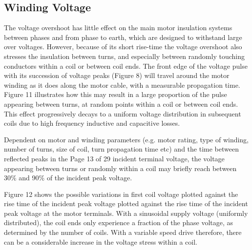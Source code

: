 \subsection{Winding Voltage}
The voltage overshoot has little effect on the main motor insulation systems between phases and from phase to earth, which are designed to withstand large over voltages. However,
because of its short rise-time the voltage overshoot also stresses the insulation between turns, and especially between randomly touching conductors within a coil or between coil ends.
The front edge of the voltage pulse with its succession of voltage peaks (Figure 8) will travel around the motor winding as it does along the motor cable, with a measurable propagation
time. Figure 11 illustrates how this may result in a large proportion of the pulse appearing between turns, at random points within a coil or between coil ends. This effect progressively
decays to a uniform voltage distribution in subsequent coils due to high frequency inductive and capacitive losses.

Dependent on motor and winding parameters (e.g. motor rating, type of winding, number of turns, size of coil, turn propagation time etc) and the time between reflected peaks in the Page 13 of 29
incident terminal voltage, the voltage appearing between turns or randomly within a coil may briefly reach between 30\% and 90\% of the incident peak voltage.

Figure 12 shows the possible variations in first coil voltage plotted against the rise time of the incident peak voltage plotted against the rise time of the incident peak voltage at the motor
terminals.
With a sinusoidal supply voltage (uniformly distributed), the coil ends only experience a fraction of the phase voltage, as determined by the number of coils. With a variable speed drive
therefore, there can be a considerable increase in the voltage stress within a coil.


